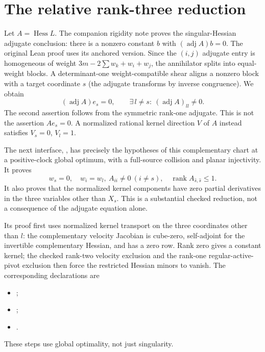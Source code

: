 \documentclass[11pt,a4paper]{article}
\newcommand{\Hess}{\operatorname{Hess}}
\newcommand{\adj}{\operatorname{adj}}
\newcommand{\rank}{\operatorname{rank}}
\begin{document}
\section{The relative rank-three reduction}
Let $A=\Hess L$. The companion rigidity note proves the singular-Hessian adjugate conclusion: there is a nonzero constant $b$ with $(\adj A)b=0$. The original Lean proof uses its anchored version. Since the $(i,j)$ adjugate entry is homogeneous of weight $3m-2\sum w_k+w_i+w_j$, the annihilator splits into equal-weight blocks. A determinant-one weight-compatible shear aligns a nonzero block with a target coordinate $s$ (the adjugate transforms by inverse congruence). We obtain
\[
 (\adj A)e_s=0,\qquad \exists\, l\ne s:\ (\adj A)_{ll}\ne0.
\]
The second assertion follows from the symmetric rank-one adjugate. This is not the assertion $Ae_s=0$. A normalized rational kernel direction $V$ of $A$ instead satisfies $V_s=0$, $V_l=1$.

The next interface, , has precisely the hypotheses of this complementary chart at a positive-clock global optimum, with a full-source collision and planar injectivity. It proves
\begin{equation}\label{eq:frontier}
 w_s=0,\quad w_i=w_l,\ A_{ii}\ne0\ (i\ne s),\quad
 \rank A_{\widehat{s},\widehat{s}}\le1 .
\end{equation}
It also proves that the normalized kernel components have zero partial derivatives in the three variables other than $X_s$. This is a substantial checked reduction, not a consequence of the adjugate equation alone.

Its proof first uses normalized kernel transport on the three coordinates other than $l$: the complementary velocity Jacobian is cube-zero, self-adjoint for the invertible complementary Hessian, and has a zero row. Rank zero gives a constant kernel; the checked rank-two velocity exclusion and the rank-one regular-active-pivot exclusion then force the restricted Hessian minors to vanish. The corresponding declarations are
\begin{itemize}
\item {};
\item {};
\item {}.
\end{itemize}
These steps use global optimality, not just singularity.
\end{document}
